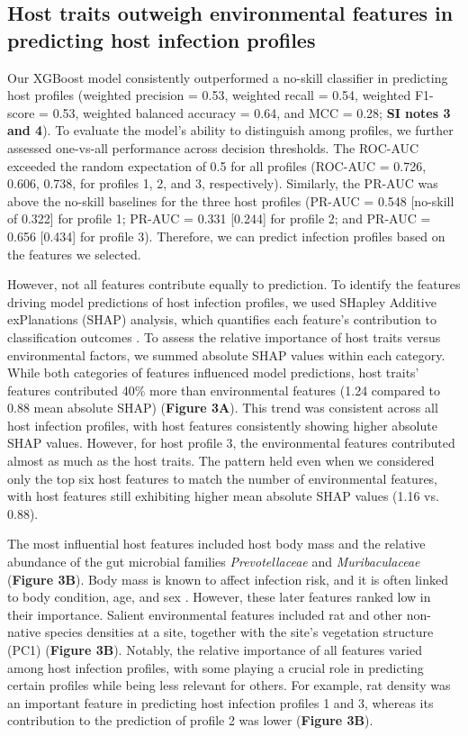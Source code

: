\documentclass[oneside, a4paper, onecolumn, 11pt]{article}
\begin{document}
\subsection*{Host traits outweigh environmental features in predicting host infection profiles}

Our XGBoost model consistently outperformed a no-skill classifier in predicting host profiles (weighted precision = 0.53, weighted recall = 0.54, weighted F1-score = 0.53, weighted balanced accuracy = 0.64, and MCC = 0.28; \textbf{SI notes 3 and 4}). To evaluate the model’s ability to distinguish among profiles, we further assessed one-vs-all performance across decision thresholds. The ROC-AUC exceeded the random expectation of 0.5 for all profiles (ROC-AUC = 0.726, 0.606, 0.738, for profiles 1, 2, and 3, respectively). Similarly, the PR-AUC was above the no-skill baselines for the three host profiles (PR-AUC = 0.548 [no-skill of 0.322] for profile 1; PR-AUC = 0.331 [0.244] for profile 2; and PR-AUC = 0.656 [0.434] for profile 3). Therefore, we can predict infection profiles based on the features we selected.

However, not all features contribute equally to prediction. To identify the features driving model predictions of host infection profiles, we used SHapley Additive exPlanations (SHAP) analysis, which quantifies each feature’s contribution to classification outcomes \citep{Lundberg2017-dr}. To assess the relative importance of host traits versus environmental factors, we summed absolute SHAP values within each category. While both categories of features influenced model predictions, host traits' features contributed 40\% more than environmental features (1.24 compared to 0.88 mean absolute SHAP) (\textbf{Figure 3A}). This trend was consistent across all host infection profiles, with host features consistently showing higher absolute SHAP values. However, for host profile 3, the environmental features contributed almost as much as the host traits. The pattern held even when we considered only the top six host features to match the number of environmental features, with host features still exhibiting higher mean absolute SHAP values (1.16 vs. 0.88). 

The most influential host features included host body mass and the relative abundance of the gut microbial families \textit{Prevotellaceae} and \textit{Muribaculaceae} (\textbf{Figure 3B}). Body mass is known to affect infection risk, and it is often linked to body condition, age, and sex \citep{Sanchez2018-tf, Durkin2015-eu,Santin2023-yk,Izhar2015-ir,Grear2009-ch}. However, these later features ranked low in their importance. Salient environmental features included rat and other non-native species densities at a site, together with the site's vegetation structure (PC1) (\textbf{Figure 3B}). Notably, the relative importance of all features varied among host infection profiles, with some playing a crucial role in predicting certain profiles while being less relevant for others. For example, rat density was an important feature in predicting host infection profiles 1 and 3, whereas its contribution to the prediction of profile 2 was lower (\textbf{Figure 3B}).
\end{document}
